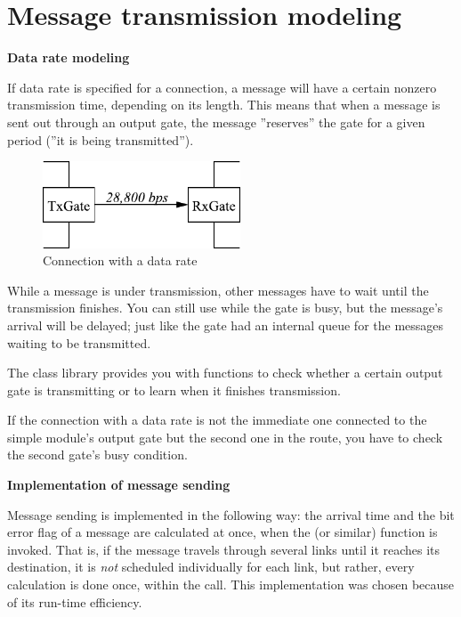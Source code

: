 \section{Message transmission modeling}

\textbf{Data rate modeling}


If data rate is specified for a connection, a message
will have a certain nonzero transmission time, depending on its length.  This means that when a message is
sent out through an output gate, the message ''reserves'' the gate for
a given period (''it is being transmitted'').

\begin{figure}[htbp]
  \begin{center}
    \includegraphics[width=2.315in, height=1.015in]{figures/usmanFig9}
    \caption{Connection with a data rate}
    \label{fig:ch-simple-modules:conn-w-data-rate}
  \end{center}
\end{figure}

While a message is under transmission, other messages have to wait
until the transmission finishes. You can still use 
while the gate is busy, but the message's arrival will be delayed;
just like the gate had an internal queue for the messages waiting to
be transmitted.


The {\opp} class library provides you with functions to check
whether a certain output gate is transmitting or to learn when
it finishes transmission.


If the connection with a data rate is not the immediate one connected
to the simple module's output gate but the second
one in the route, you have to check the second gate's busy
condition.


\textbf{Implementation of message sending}


Message sending is implemented in the following way: the arrival
time and the bit error flag of a
message are calculated at once, when the  (or similar)
function is invoked. That is, if the message travels through several
links until it reaches its destination, it is \textit{not} scheduled
individually for each link, but rather, every calculation is done
once, within the  call. This implementation was chosen
because of its run-time efficiency.

